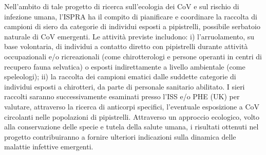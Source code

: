 {Nell’ambito di tale progetto di ricerca sull’ecologia dei CoV e sul rischio di infezione umana, l’ISPRA ha il compito di pianificare e coordinare la raccolta di campioni di siero da categorie di individui esposti a pipistrelli, possibile serbatoio naturale di CoV emergenti. Le attività previste includono: i) l’arruolamento, su base volontaria, di individui a contatto diretto con pipistrelli durante attività occupazionali e/o ricreazionali (come chirotterologi e persone operanti in centri di recupero fauna selvatica) o esposti indirettamente a livello ambientale (come speleologi); ii) la raccolta dei campioni ematici dalle suddette categorie di individui esposti a chirotteri, da parte di personale sanitario abilitato. I sieri raccolti saranno successivamente esaminati presso l’ISS e/o PHE (UK) per valutare, attraverso la ricerca di anticorpi specifici, l’eventuale esposizione a CoV circolanti nelle popolazioni di pipistrelli.
Attraverso un approccio ecologico, volto alla conservazione delle specie e tutela della salute umana, i risultati ottenuti nel progetto contribuiranno a fornire ulteriori indicazioni sulla dinamica delle malattie infettive emergenti.
} %